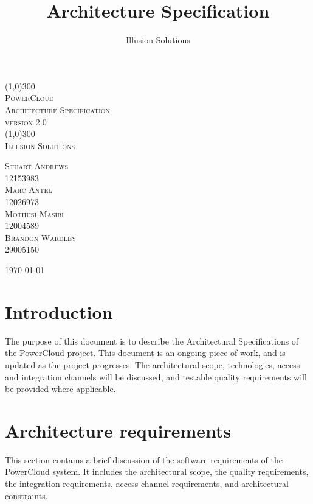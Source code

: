 \documentclass{article}
\title{
	Architecture Specification
}
\author{Illusion Solutions}
\begin{document}
	
	\begin{titlepage}
		\begin{center}
			\line(1,0){300} \\
			[0.1cm]
			\textsc{\Huge
				PowerCloud\\
				Architecture Specification
			} \\
			\textsc{\large version 2.0}\\
			[0.1cm]
			\line(1,0){300} \\
			[2.0cm]
			\textsc{\Large
				Illusion Solutions
			} \\
			[3.5cm]
			
		\end{center}
		\begin{flushright}
			\textsc{\Large
				Stuart Andrews\\ 
				12153983\\
				Marc Antel\\
				12026973\\
				Mothusi Masibi\\
				12004589\\
				Brandon Wardley\\
				29005150\\
				[4.0cm]
			}
		\end{flushright}
		\begin{center}
			\today
		\end{center}
	\end{titlepage}

\newpage
\restoregeometry
\tableofcontents
\thispagestyle{empty}

\newpage

\section{Introduction}

The purpose of this document is to describe the Architectural 
Specifications of the PowerCloud project. This document is an ongoing 
piece of work, and is updated as the project progresses. The 
architectural scope, technologies, access and integration channels will 
be discussed, and testable quality requirements will be provided where 
applicable.

\section{Architecture requirements}

This section contains a brief discussion of the software requirements of 
the PowerCloud system. It includes the architectural scope, the quality 
requirements, the integration requirements, access channel requirements, 
and architectural constraints.
\end{document}
